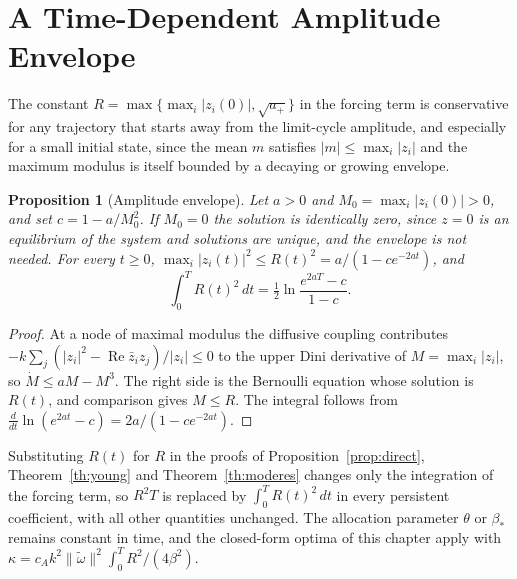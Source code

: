 \documentclass[11pt,notitlepage]{report}
\newtheorem{proposition}[theorem]{Proposition}
\theoremstyle{definition}
\theoremstyle{remark}
\newcommand{\re}{\operatorname{Re}}
\begin{document}
\section{A Time-Dependent Amplitude Envelope}
The constant $R=\max\{\max_i|z_i(0)|,\sqrt{a_+}\}$ in the forcing term is conservative for any trajectory that starts away from the limit-cycle amplitude, and especially for a small initial state, since the mean $m$ satisfies $|m|\le\max_i|z_i|$ and the maximum modulus is itself bounded by a decaying or growing envelope.
\begin{proposition}[Amplitude envelope]\label{prop:envelope}
Let $a>0$ and $M_0=\max_i|z_i(0)|>0$, and set $c=1-a/M_0^2$. If $M_0=0$ the solution is identically zero, since $z=0$ is an equilibrium of the system and solutions are unique, and the envelope is not needed. For every $t\ge0$, $\max_i|z_i(t)|^2\le R(t)^2=a/(1-ce^{-2at})$, and
\[
\int_0^TR(t)^2\,dt=\tfrac12\ln\frac{e^{2aT}-c}{1-c}.
\]
\end{proposition}
\begin{proof}
At a node of maximal modulus the diffusive coupling contributes $-k\sum_j(|z_i|^2-\re\bar z_iz_j)/|z_i|\le0$ to the upper Dini derivative of $M=\max_i|z_i|$, so $\dot M\le aM-M^3$. The right side is the Bernoulli equation whose solution is $R(t)$, and comparison gives $M\le R$. The integral follows from $\tfrac{d}{dt}\ln(e^{2at}-c)=2a/(1-ce^{-2at})$.
\end{proof}
Substituting $R(t)$ for $R$ in the proofs of Proposition~\ref{prop:direct}, Theorem~\ref{th:young} and Theorem~\ref{th:moderes} changes only the integration of the forcing term, so $R^2T$ is replaced by $\int_0^TR(t)^2\,dt$ in every persistent coefficient, with all other quantities unchanged. The allocation parameter $\theta$ or $\beta_\ast$ remains constant in time, and the closed-form optima of this chapter apply with $\kappa=c_Ak^2\|\tilde\omega\|^2\int_0^TR^2/(4\beta^2)$.
\end{document}

